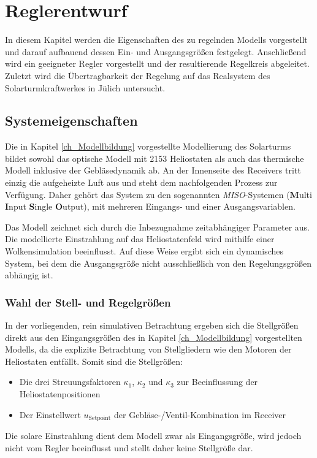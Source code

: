 \chapter{Reglerentwurf} \label{ch_Reglerentwurf}
In diesem Kapitel werden die Eigenschaften des zu regelnden Modells vorgestellt und darauf aufbauend dessen Ein- und Ausgangsgrößen festgelegt.
Anschließend wird ein geeigneter Regler vorgestellt und der resultierende Regelkreis abgeleitet.
Zuletzt wird die Übertragbarkeit der Regelung auf das Realsystem des Solarturmkraftwerkes in Jülich untersucht.

\section{Systemeigenschaften} \label{sec_Systemeigenschaften}
Die in Kapitel \ref{ch_Modellbildung} vorgestellte Modellierung des Solarturms bildet sowohl das optische Modell mit 2153 Heliostaten als auch das thermische Modell inklusive der Gebläsedynamik ab.
An der Innenseite des Receivers tritt einzig die aufgeheizte Luft aus und steht dem nachfolgenden Prozess zur Verfügung.
Daher gehört das System zu den sogenannten \mbox{\textit{MISO}-Systemen} (\textbf{M}ulti \textbf{I}nput \textbf{S}ingle \textbf{O}utput), mit mehreren Eingangs- und einer Ausgangsvariablen.

Das Modell zeichnet sich durch die Inbezugnahme zeitabhängiger Parameter aus.
Die modellierte Einstrahlung auf das Heliostatenfeld wird mithilfe einer Wolkensimulation beeinflusst.
Auf diese Weise ergibt sich ein dynamisches System, bei dem die Ausgangsgröße nicht ausschließlich von den Regelungsgrößen abhängig ist.


\subsection{Wahl der Stell- und Regelgrößen} \label{subsec_EinAusgangsgrößen}
In der vorliegenden, rein simulativen Betrachtung ergeben sich die Stellgrößen direkt aus den Eingangsgrößen des in Kapitel \ref{ch_Modellbildung} vorgestellten Modells, da die explizite Betrachtung von Stellgliedern wie den Motoren der Heliostaten entfällt.
Somit sind die Stellgrößen:
\begin{itemize}
    \item Die drei Streuungsfaktoren $\kappa_1$, $\kappa_2$ und $\kappa_3$ zur Beeinflussung der Heliostatenpositionen
    \item Der Einstellwert $u_{\mathrm{Setpoint}}$ der Gebläse-/Ventil-Kombination im Receiver
\end{itemize}
Die solare Einstrahlung dient dem Modell zwar als Eingangsgröße, wird jedoch nicht vom Regler beeinflusst und stellt daher keine Stellgröße dar.

